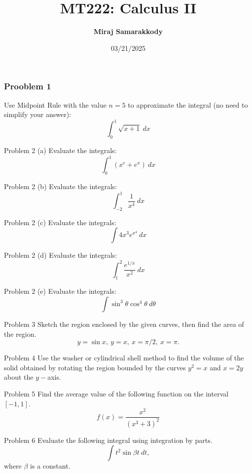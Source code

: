 \documentclass{beamer}
\title{MT222: Calculus II}
\author{\textbf{Miraj Samarakkody}}
\institute{Tougaloo College}
\date{03/21/2025}
\begin{document}
\begin{frame}
    \titlepage
\end{frame}

\begin{frame}
    \frametitle{Prooblem 1}
    Use Midpoint Rule with the value \(n=5\) to approximate the integral (no need to simplify your answer):
    \[
    \int_0^1 \sqrt{x+1}~dx
    \] 
\end{frame}

\begin{frame}{Problem 2 (a)}
    Evaluate the integrals:
    \[\displaystyle
    \int_0^1 (x^e+e^x)~dx
    \]
\end{frame}

\begin{frame}{Problem 2 (b)}
    Evaluate the integrals:
    \[\displaystyle
    \int_{-2}^1 \dfrac{1}{x^4}~dx
    \]
\end{frame}

\begin{frame}{Problem 2 (c)}
    Evaluate the integrals:
    \[\int 4x^3 e^{x^4}~dx
    \]
\end{frame}

\begin{frame}{Problem 2 (d)}
    Evaluate the integrals:
    \[\int_1^2 \dfrac{e^{1/x}}{x^2}~dx
    \]
\end{frame}


\begin{frame}{Problem 2 (e)}
    Evaluate the integrals:
    \[\int \sin^3 \theta \cos^4 \theta~d\theta
    \]
\end{frame}

\begin{frame}{Problem 3}
    Sketch the region enclosed by the given curves, then find the area of the region. \[
y= \sin x,~ y=x, ~x =\pi/2,~x=\pi.
\]
\end{frame}

\begin{frame}{Problem 4}
    Use the washer or cylindrical shell method to find the volume of the solid obtained by rotating the region bounded by the curves $y^2=x$ and $x=2y$ about the $y-$axis.
\end{frame}

\begin{frame}{Problem 5}
    Find the average value of the following function on the interval \([-1,1]\). 
\[
f(x)=\dfrac{x^2}{(x^3+3)^2}
\] 
\end{frame}

\begin{frame}{Problem 6}
    Evaluate the following integral using integration by parts.
\[
\int t^2 \sin {\beta t}~dt,
\] where \(\beta \) is a constant. 
\end{frame}
\end{document}
